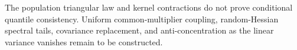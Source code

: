 The population triangular law and kernel contractions do not prove conditional quantile consistency. Uniform common-multiplier coupling, random-Hessian spectral tails, covariance replacement, and anti-concentration as the linear variance vanishes remain to be constructed.